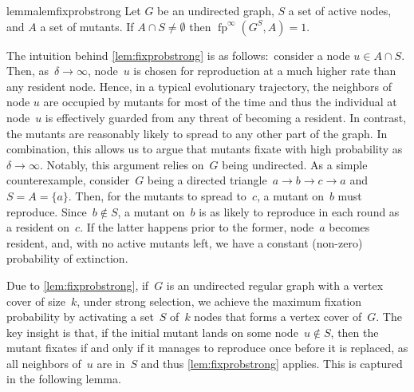 \documentclass[letterpaper]{article}
\newcommand{\X}{\mathsf{X}}
\newcommand{\fp}{\operatorname{fp}}
\newcommand{\FitAdv}{\delta}
\begin{document}
\begin{restatable}{lemma}{lemfixprobstrong}\label{lem:fixprobstrong}
Let $G$ be an undirected graph, $S$ a set of active nodes, and $A$ a set of mutants. If  $A\cap S\neq \emptyset$ then $\fp^{\infty}(G^S, A)=1$.
\end{restatable}

The intuition behind \cref{lem:fixprobstrong} is as follows:~consider a node $u\in A\cap S$.
Then, as~$\FitAdv\to\infty$, node~$u$ is chosen for reproduction at a much higher rate than any resident node.
Hence, in a typical evolutionary trajectory, the neighbors of node $u$ are occupied by mutants for most of the time and thus the individual at node~$u$ is effectively guarded from any threat of becoming a resident.
In contrast, the mutants are reasonably likely to spread to any other part of the graph.
In combination, this allows us to argue that mutants fixate with high probability as~$\FitAdv\to\infty$.
Notably, this argument relies on~$G$ being undirected.
As a simple counterexample, consider~$G$ being a directed triangle~$a\to b\to c\to a$ and~$S = A = \{a\}$. 
Then, for the mutants to spread to~$c$, a mutant on~$b$ must reproduce. 
Since~$b\not \in S$, a mutant on~$b$ is as likely to reproduce in each round as a resident on~$c$. 
If the latter happens prior to the former, node~$a$ becomes resident, and, with no active mutants left, we have a constant (non-zero) probability of extinction.

Due to \cref{lem:fixprobstrong}, if~$G$ is an undirected regular graph with a vertex cover of size~$k$, under strong selection, we achieve the maximum fixation probability by activating a set~$S$ of~$k$ nodes that forms a vertex cover of~$G$. The key insight is that, if the initial mutant lands on some node~$u\not \in S$, then the mutant fixates if and  only if it manages to reproduce once before it is replaced, as all neighbors of~$u$ are in~$S$ and thus \cref{lem:fixprobstrong} applies. This is captured in the following lemma.
\end{document}

